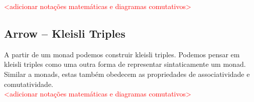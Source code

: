 \documentclass[10pt, conference]{IEEEtran}
\begin{document}
\textcolor{red}{<adicionar notações matemáticas e diagramas comutativos>}

\subsection{Arrow -- Kleisli Triples}

A partir de um monad podemos construir kleisli triples. Podemos pensar em kleisli triples como uma outra forma de representar sintaticamente um monad. Similar a monads, estas também obedecem as propriedades de associatividade e comutatividade.\\

\textcolor{red}{<adicionar notações matemáticas e diagramas comutativos>}



\end{document}
